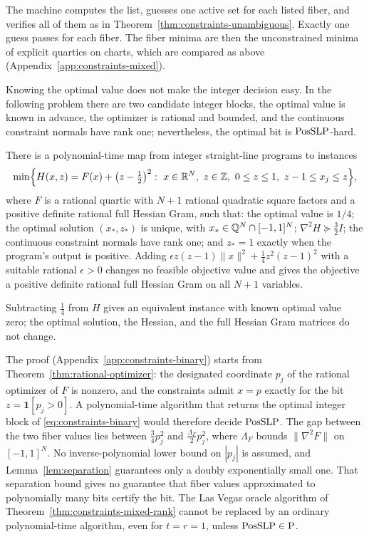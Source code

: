 The machine computes the list, guesses one active set for each listed fiber,
and verifies all of them as in Theorem~\ref{thm:constraints-unambiguous}.
Exactly one guess passes for each fiber. The fiber minima are then the
unconstrained minima of explicit quartics on charts, which are compared as
above (Appendix~\ref{app:constraints-mixed}).

Knowing the optimal value does not make the integer decision easy. In the
following problem there are two candidate integer blocks, the optimal value is
known in advance, the optimizer is rational and bounded, and the continuous
constraint normals have rank one; nevertheless, the optimal bit is
$\mathrm{PosSLP}$-hard.

\begin{corollary}
\label{cor:constraints-binary}
There is a polynomial-time map from integer straight-line programs to
instances
\begin{equation}\label{eq:constraints-binary}
 \min\Bigl\{H(x,z)=F(x)+\bigl(z-\tfrac12\bigr)^2:\
 x\in\mathbb R^N,\ z\in\mathbb Z,\ 0\le z\le1,\ z-1\le x_j\le z\Bigr\},
\end{equation}
where $F$ is a rational quartic with $N+1$ rational quadratic square factors
and a positive definite rational full Hessian Gram, such that: the optimal
value is $1/4$; the optimal solution $(x_*,z_*)$ is unique, with
$x_*\in\mathbb Q^N\cap[-1,1]^N$; $\nabla^2H\succeq\frac32I$; the continuous
constraint normals have rank one; and $z_*=1$ exactly when the program's
output is positive. Adding $\epsilon z(z-1)\|x\|^2+\frac14z^2(z-1)^2$ with a
suitable rational $\epsilon>0$ changes no feasible objective value and gives
the objective a positive definite rational full Hessian Gram on all $N+1$
variables.
\end{corollary}

Subtracting $\frac14$ from $H$ gives an equivalent instance with known
optimal value zero; the optimal solution, the Hessian, and the full Hessian
Gram matrices do not change.

The proof (Appendix~\ref{app:constraints-binary}) starts from
Theorem~\ref{thm:rational-optimizer}: the designated coordinate $p_j$ of the
rational optimizer of $F$ is nonzero, and the constraints admit $x=p$ exactly
for the bit $z=\mathbf 1[p_j>0]$. A polynomial-time algorithm that returns the
optimal integer block of \eqref{eq:constraints-binary} would therefore decide
$\mathrm{PosSLP}$. The gap between the two fiber values lies between
$\frac34p_j^2$ and $\frac{\Lambda_F}2p_j^2$, where $\Lambda_F$ bounds
$\|\nabla^2F\|$ on $[-1,1]^N$. No inverse-polynomial lower bound on $|p_j|$ is
assumed, and Lemma~\ref{lem:separation} guarantees only a doubly
exponentially small one. That separation bound gives no guarantee that fiber
values approximated to polynomially many bits certify the bit. The Las Vegas oracle algorithm of
Theorem~\ref{thm:constraints-mixed-rank} cannot be replaced by an ordinary
polynomial-time algorithm, even for $t=r=1$, unless $\mathrm{PosSLP}\in\mathrm P$.

